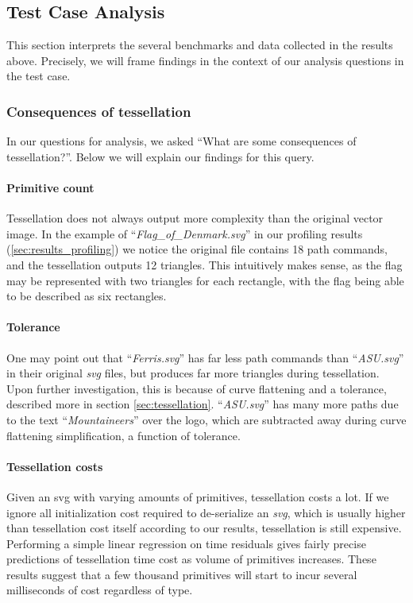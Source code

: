 

\subsection{Test Case Analysis}
This section interprets the several benchmarks and data collected in the results above. Precisely, we will frame findings in the context of our analysis questions in the test case.\medskip

\subsubsection{Consequences of tessellation}
In our questions for analysis, we asked ``What are some consequences of tessellation?''. Below we will explain our findings for this query.\medskip

\paragraph{Primitive count} Tessellation does not always output more complexity than the original vector image. In the example of ``\textit{Flag\_of\_Denmark.svg}'' in our profiling results (\cref{sec:results_profiling}) we notice the original file contains 18 path commands, and the tessellation outputs 12 triangles. This intuitively makes sense, as the flag may be represented with two triangles for each rectangle, with the flag being able to be described as six rectangles.

\paragraph{Tolerance} One may point out that ``\textit{Ferris.svg}'' has far less path commands than ``\textit{ASU.svg}'' in their original \textit{svg} files, but produces far more triangles during tessellation. Upon further investigation, this is because of curve flattening and a tolerance, described more in section \cref{sec:tessellation}. ``\textit{ASU.svg}'' has many more paths due to the text ``\textit{Mountaineers}'' over the logo, which are subtracted away during curve flattening simplification, a function of tolerance.

\paragraph{Tessellation costs} Given an svg with varying amounts of primitives, tessellation costs a lot. If we ignore all initialization cost required to de-serialize an \textit{svg}, which is usually higher than tessellation cost itself according to our results, tessellation is still expensive. Performing a simple linear regression on time residuals gives fairly precise predictions of tessellation time cost as volume of primitives increases. These results suggest that a few thousand primitives will start to incur several milliseconds of cost regardless of type.

